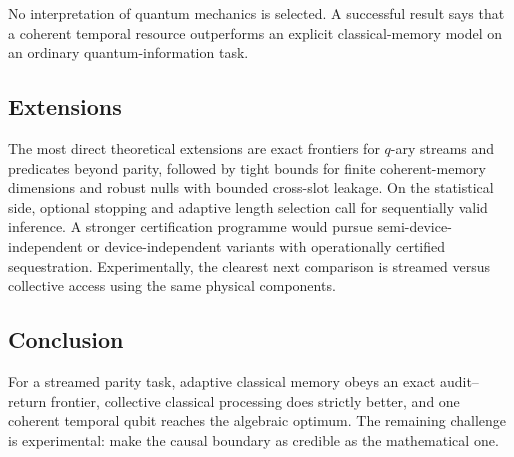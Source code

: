 No interpretation of quantum mechanics is selected. A successful result says that a coherent temporal resource outperforms an explicit classical-memory model on an ordinary quantum-information task.

\subsection{Extensions}

The most direct theoretical extensions are exact frontiers for $q$-ary streams and predicates beyond parity, followed by tight bounds for finite coherent-memory dimensions and robust nulls with bounded cross-slot leakage. On the statistical side, optional stopping and adaptive length selection call for sequentially valid inference. A stronger certification programme would pursue semi-device-independent or device-independent variants with operationally certified sequestration. Experimentally, the clearest next comparison is streamed versus collective access using the same physical components.

\subsection{Conclusion}

For a streamed parity task, adaptive classical memory obeys an exact audit--return frontier, collective classical processing does strictly better, and one coherent temporal qubit reaches the algebraic optimum. The remaining challenge is experimental: make the causal boundary as credible as the mathematical one.
